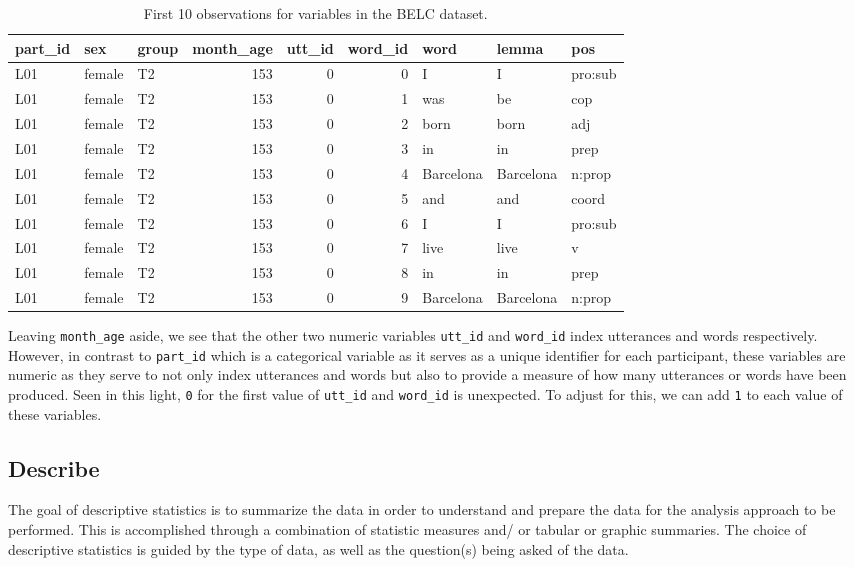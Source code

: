 \documentclass[
  letterpaper,
  DIV=11,
  numbers=noendperiod]{scrreport}
\theoremstyle{definition}
\theoremstyle{remark}
\begin{document}
\hypertarget{tbl-aa-belc-numeric}{}
\begin{table}
\caption{\label{tbl-aa-belc-numeric}First 10 observations for variables in the BELC dataset. }\tabularnewline

\centering
\begin{tabular}{l|l|l|r|r|r|l|l|l}
\hline
part\_id & sex & group & month\_age & utt\_id & word\_id & word & lemma & pos\\
\hline
L01 & female & T2 & 153 & 0 & 0 & I & I & pro:sub\\
\hline
L01 & female & T2 & 153 & 0 & 1 & was & be & cop\\
\hline
L01 & female & T2 & 153 & 0 & 2 & born & born & adj\\
\hline
L01 & female & T2 & 153 & 0 & 3 & in & in & prep\\
\hline
L01 & female & T2 & 153 & 0 & 4 & Barcelona & Barcelona & n:prop\\
\hline
L01 & female & T2 & 153 & 0 & 5 & and & and & coord\\
\hline
L01 & female & T2 & 153 & 0 & 6 & I & I & pro:sub\\
\hline
L01 & female & T2 & 153 & 0 & 7 & live & live & v\\
\hline
L01 & female & T2 & 153 & 0 & 8 & in & in & prep\\
\hline
L01 & female & T2 & 153 & 0 & 9 & Barcelona & Barcelona & n:prop\\
\hline
\end{tabular}
\end{table}

Leaving \texttt{month\_age} aside, we see that the other two numeric
variables \texttt{utt\_id} and \texttt{word\_id} index utterances and
words respectively. However, in contrast to \texttt{part\_id} which is a
categorical variable as it serves as a unique identifier for each
participant, these variables are numeric as they serve to not only index
utterances and words but also to provide a measure of how many
utterances or words have been produced. Seen in this light, \texttt{0}
for the first value of \texttt{utt\_id} and \texttt{word\_id} is
unexpected. To adjust for this, we can add \texttt{1} to each value of
these variables.

\hypertarget{sec-aa-describe}{%
\subsection{Describe}\label{sec-aa-describe}}

The goal of descriptive statistics is to summarize the data in order to
understand and prepare the data for the analysis approach to be
performed. This is accomplished through a combination of statistic
measures and/ or tabular or graphic summaries. The choice of descriptive
statistics is guided by the type of data, as well as the question(s)
being asked of the data.
\end{document}
